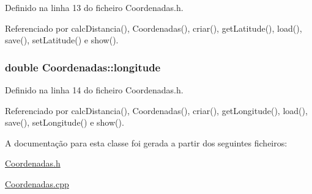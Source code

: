 Definido na linha 13 do ficheiro Coordenadas.\+h.



Referenciado por calc\+Distancia(), Coordenadas(), criar(), get\+Latitude(), load(), save(), set\+Latitude() e show().

\hypertarget{class_coordenadas_a328c0d572b3a7d47bfbd866f5d6d6489}{
\subsubsection[{longitude}]{\setlength{\rightskip}{0pt plus 5cm}double Coordenadas\+::longitude\hspace{0.3cm}{\ttfamily [private]}}}\label{class_coordenadas_a328c0d572b3a7d47bfbd866f5d6d6489}


Definido na linha 14 do ficheiro Coordenadas.\+h.



Referenciado por calc\+Distancia(), Coordenadas(), criar(), get\+Longitude(), load(), save(), set\+Longitude() e show().



A documentação para esta classe foi gerada a partir dos seguintes ficheiros\+:\begin{DoxyCompactItemize}
\item 
\hyperlink{_coordenadas_8h}{Coordenadas.\+h}\item 
\hyperlink{_coordenadas_8cpp}{Coordenadas.\+cpp}\end{DoxyCompactItemize}
